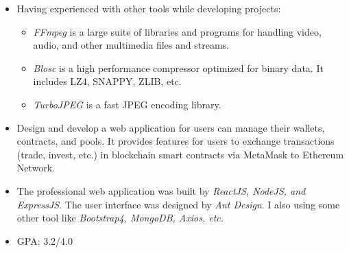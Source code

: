\documentclass[10pt,a4paper,ragged2e,withhyper]{altacv}
\begin{document}
\begin{paracol}{2}
\begin{minipage}{\linewidth}
\begin{itemize}
	\item Having experienced with other tools while developing projects:
	\begin{itemize}
		\renewcommand\labelitemii{--}
		
		\item \textit{FFmpeg} is a large suite of libraries and programs for handling video, audio, and other multimedia files and streams.
		\item \textit{Blosc} is a high performance compressor optimized for binary data. It includes LZ4, SNAPPY, ZLIB, etc.
		\item \textit{TurboJPEG} is a fast JPEG encoding library.
	\end{itemize}
\end{itemize}
\end{minipage}

\smallskip

\divider

\medskip 

\begin{itemize}
	
\justifying
\item Design and develop a web application for users can manage their wallets, contracts, and pools. It provides features for users to exchange transactions (trade, invest, etc.) in blockchain smart contracts via MetaMask to Ethereum Network.
\item The professional web application was built by \textit{ReactJS, NodeJS, and ExpressJS}. The user interface was designed by \textit{Ant Design}. I also using some other tool like \textit{Bootstrap4, MongoDB, Axios, etc.}

\end{itemize}



\medskip


\switchcolumn

\begin{itemize}
	\item GPA: 3.2/4.0
\end{itemize}
\smallskip


\end{paracol}
\end{document}
